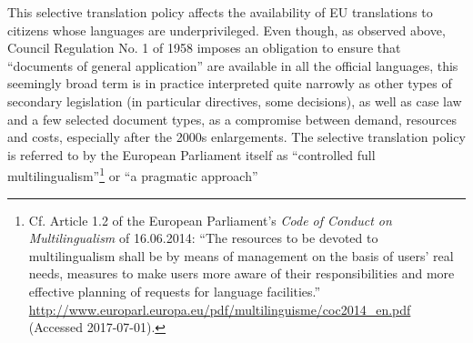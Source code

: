 \documentclass[output=paper]{langsci/langscibook}
\begin{document}
This selective translation policy affects the availability of EU translations to citizens whose languages are underprivileged. Even though, as observed above, Council Regulation No. 1 of 1958 imposes an obligation to ensure that “documents of general application” are available in all the official languages, this seemingly broad term is in practice interpreted quite narrowly as other types of secondary legislation (in particular directives, some decisions), as well as case law and a few selected document types, as a compromise between demand, resources and costs, especially after the 2000s enlargements. The selective translation policy is referred to by the European Parliament itself as “controlled full multilingualism”\footnote{Cf. Article 1.2 of the European Parliament’s \textit{Code of Conduct on Multilingualism} of 16.06.2014: “The resources to be devoted to multilingualism shall be  by means of management on the basis of users’ real needs, measures to make users more aware of their responsibilities and more effective planning of requests for language facilities.” \url{http://www.europarl.europa.eu/pdf/multilinguisme/coc2014_en.pdf} (Accessed 2017-07-01).} 
or “a pragmatic approach”
\end{document}
